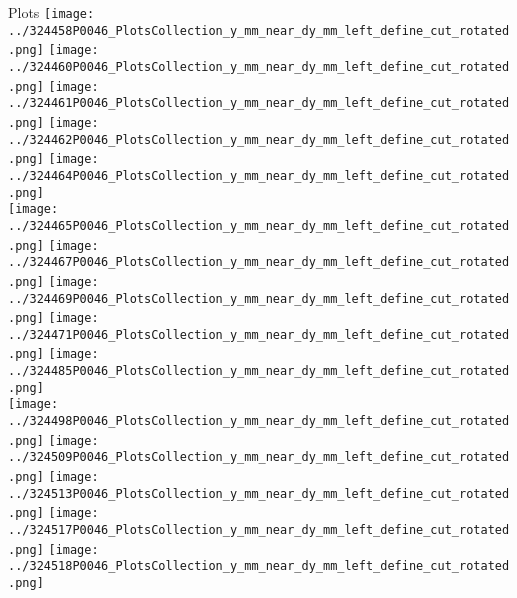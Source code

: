 \documentclass{beamer}
\begin{document}
\begin{frame}\tiny
        \begin{block}{Plots}
		  \centering
                \texttt{[image: ../324458P0046\_PlotsCollection\_y\_mm\_near\_dy\_mm\_left\_define\_cut\_rotated.png]}
                \texttt{[image: ../324460P0046\_PlotsCollection\_y\_mm\_near\_dy\_mm\_left\_define\_cut\_rotated.png]}
                \texttt{[image: ../324461P0046\_PlotsCollection\_y\_mm\_near\_dy\_mm\_left\_define\_cut\_rotated.png]}
                \texttt{[image: ../324462P0046\_PlotsCollection\_y\_mm\_near\_dy\_mm\_left\_define\_cut\_rotated.png]}
                \texttt{[image: ../324464P0046\_PlotsCollection\_y\_mm\_near\_dy\_mm\_left\_define\_cut\_rotated.png]}\\
                \texttt{[image: ../324465P0046\_PlotsCollection\_y\_mm\_near\_dy\_mm\_left\_define\_cut\_rotated.png]}
                \texttt{[image: ../324467P0046\_PlotsCollection\_y\_mm\_near\_dy\_mm\_left\_define\_cut\_rotated.png]}
                \texttt{[image: ../324469P0046\_PlotsCollection\_y\_mm\_near\_dy\_mm\_left\_define\_cut\_rotated.png]}
                \texttt{[image: ../324471P0046\_PlotsCollection\_y\_mm\_near\_dy\_mm\_left\_define\_cut\_rotated.png]}
                \texttt{[image: ../324485P0046\_PlotsCollection\_y\_mm\_near\_dy\_mm\_left\_define\_cut\_rotated.png]}\\
                \texttt{[image: ../324498P0046\_PlotsCollection\_y\_mm\_near\_dy\_mm\_left\_define\_cut\_rotated.png]}
                \texttt{[image: ../324509P0046\_PlotsCollection\_y\_mm\_near\_dy\_mm\_left\_define\_cut\_rotated.png]}
                \texttt{[image: ../324513P0046\_PlotsCollection\_y\_mm\_near\_dy\_mm\_left\_define\_cut\_rotated.png]}
                \texttt{[image: ../324517P0046\_PlotsCollection\_y\_mm\_near\_dy\_mm\_left\_define\_cut\_rotated.png]}
                \texttt{[image: ../324518P0046\_PlotsCollection\_y\_mm\_near\_dy\_mm\_left\_define\_cut\_rotated.png]}\\

\end{block}
\end{frame}
\end{document}
